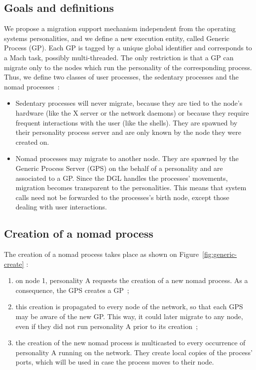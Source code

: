 \subsection {Goals and definitions}

We propose a migration support mechanism independent from the operating systems
personalities, and we define a new execution entity, 
called Generic Process (GP).
Each GP is tagged by a unique global identifier and corresponds to a Mach task, possibly
multi-threaded. The only restriction is that a GP can migrate only to the nodes
which run the personality of the corresponding process.
Thus, we define two classes of user processes, the sedentary processes and the
nomad processes~:
\begin{itemize} 
\item Sedentary processes will never migrate, because they are tied
to the node's hardware (like the X server or the network daemons) or
because they require frequent interactions with the user (like the shells).
They are spawned by their personality process server and are only known by
the node they were created on.
\item Nomad processes may migrate to another node. They are spawned by the 
Generic Process Server (GPS) on the behalf of a personality and are associated
to a GP. Since the DGL handles the processes' movements, migration becomes transparent to the personalities. This means that system calls 
need not be forwarded to the processes's birth node, except those dealing with 
user interactions. 
\end{itemize}

\subsection{Creation of a nomad process}
The creation of a nomad process takes place as shown on Figure~\ref{fig:generic-create} :
\begin{enumerate}
\item on node 1, personality A requests the creation of a new nomad process. As a consequence, the GPS creates a GP~;
\item this creation is propagated to every node of the network, so that each GPS may be aware of the new GP. This way, it could later migrate to any node, even if they did not run personality A prior to its creation~; 
\item the creation of the new nomad process is multicasted to every occurrence of personality A running on the network. They create local copies of the process' ports, which will be used in case the process moves to their node. 
\end{enumerate}

